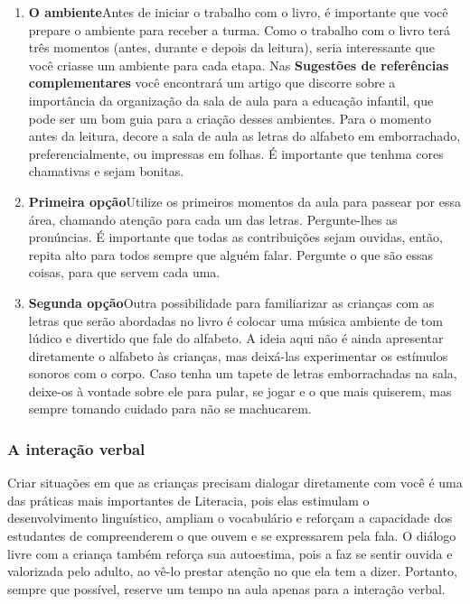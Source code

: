 \documentclass[11pt]{extarticle}
\begin{document}
\begin{enumerate}
\item \textbf{O ambiente}\quad Antes de iniciar o trabalho com o livro, é importante que você 
prepare o ambiente para receber a turma. Como o trabalho com o livro terá 
três momentos (antes, durante e depois da leitura), seria interessante que você 
criasse um ambiente para cada etapa. Nas \textbf{Sugestões de referências complementares} 
você encontrará um artigo que discorre sobre a importância da organização da sala 
de aula para a educação infantil, que pode ser um bom guia para a criação desses 
ambientes. Para o momento antes da leitura, decore a sala de aula as letras
do alfabeto em emborrachado, preferencialmente, ou impressas em folhas.
É importante que tenhma cores chamativas e sejam bonitas. 


\item \textbf{Primeira opção}\quad Utilize os primeiros 
momentos da aula para passear por essa área, chamando atenção para cada um 
das letras. Pergunte-lhes as pronúncias. É importante que todas as contribuições sejam ouvidas, então,
repita alto para todos sempre que alguém falar. Pergunte o que são essas coisas, 
para que servem cada uma. 

\item \textbf{Segunda opção}\quad Outra possibilidade para familiarizar 
as crianças com as letras que serão abordadas no livro é colocar uma música ambiente
de tom lúdico e divertido que fale do alfabeto. A ideia aqui não
é ainda apresentar diretamente o alfabeto às crianças,
mas deixá-las experimentar os estímulos sonoros com o corpo. 
Caso tenha um tapete de letras emborrachadas na sala, deixe-os à vontade 
sobre ele para pular, se jogar e o que mais quiserem, mas sempre
tomando cuidado para não se machucarem.
\end{enumerate}


\subsubsection{A interação verbal} 
Criar situações em que as crianças precisam dialogar diretamente com 
você é uma das práticas mais importantes de Literacia, pois elas estimulam 
o desenvolvimento linguístico, ampliam o vocabulário e reforçam a 
capacidade dos estudantes de compreenderem o que ouvem e se expressarem 
pela fala. O diálogo livre com a criança também reforça sua autoestima, pois 
a faz se sentir ouvida e valorizada pelo adulto, ao vê-lo prestar atenção 
no que ela tem a dizer. Portanto, sempre que possível, reserve um tempo na 
aula apenas para a interação verbal. 
\end{document}
